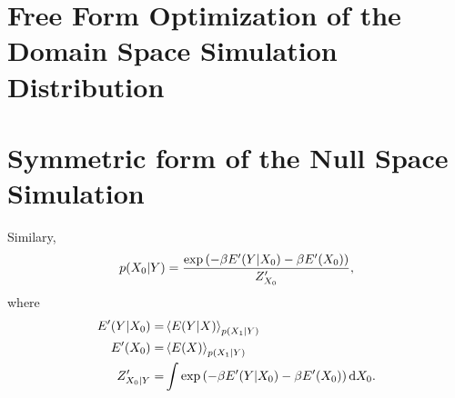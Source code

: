 \documentclass[]{article}
\begin{document}
\section{Free Form Optimization of the Domain Space Simulation Distribution} \label{sec-free-form-optimization-of-the-domain-space-simulation-distribution}

\section{Symmetric form of the Null Space Simulation}\label{sec-symmetric-form-of-the-null-space-simulation}

Similary, 
\[
p(X_0|Y) = \frac{\exp\left(-\beta E^\prime(Y |X_0) - \beta E^\prime(X_0)\right)}{Z^\prime_{X_0}},
\] 
where 
\begin{align*}
E^\prime(Y |X_0) = & \left\langle E(Y |X) \right\rangle_{p(X_1|Y)} \\
E^\prime(X_0) = & \left\langle E(X) \right\rangle_{p(X_1|Y)} \\
Z^\prime_{X_0 | Y} = & \int \exp\left(-\beta E^\prime(Y |X_0) - \beta E^\prime(X_0)\right) \text{d}X_0. 
\end{align*}
\end{document}

